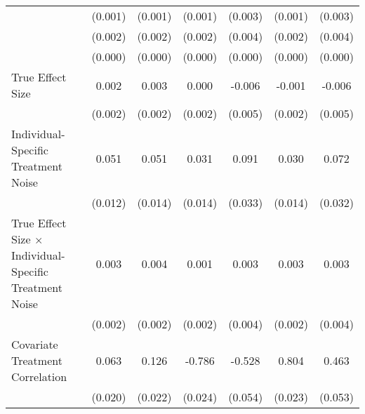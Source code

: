 \begin{table}[htbp]
\begin{tabular}{l*{6}{c}}
                    &     (0.001)         &     (0.001)         &     (0.001)         &     (0.003)         &     (0.001)         &     (0.003)         \\
                    &     (0.002)         &     (0.002)         &     (0.002)         &     (0.004)         &     (0.002)         &     (0.004)         \\
                    &     (0.000)         &     (0.000)         &     (0.000)         &     (0.000)         &     (0.000)         &     (0.000)         \\
True Effect Size    &       0.002         &       0.003         &       0.000         &      -0.006         &      -0.001         &      -0.006         \\
                    &     (0.002)         &     (0.002)         &     (0.002)         &     (0.005)         &     (0.002)         &     (0.005)         \\
Individual-Specific Treatment Noise&       0.051\sym{***}&       0.051\sym{***}&       0.031\sym{*}  &       0.091\sym{**} &       0.030\sym{*}  &       0.072\sym{*}  \\
                    &     (0.012)         &     (0.014)         &     (0.014)         &     (0.033)         &     (0.014)         &     (0.032)         \\
True Effect Size $\times$ Individual-Specific Treatment Noise&       0.003\sym{*}  &       0.004\sym{*}  &       0.001         &       0.003         &       0.003         &       0.003         \\
                    &     (0.002)         &     (0.002)         &     (0.002)         &     (0.004)         &     (0.002)         &     (0.004)         \\
Covariate Treatment Correlation&       0.063\sym{**} &       0.126\sym{***}&      -0.786\sym{***}&      -0.528\sym{***}&       0.804\sym{***}&       0.463\sym{***}\\
                    &     (0.020)         &     (0.022)         &     (0.024)         &     (0.054)         &     (0.023)         &     (0.053)         \\

\end{tabular}
\end{table}

